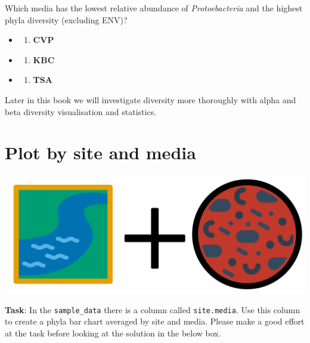 \documentclass[
]{book}
\providecommand{\tightlist}{%
  \setlength{\itemsep}{0pt}\setlength{\parskip}{0pt}}
\begin{document}
Which media has the lowest relative abundance of \emph{Protoebacteria} and the highest phyla diversity (excluding ENV)?

\begin{itemize}
\item
  \begin{enumerate}
  \def\labelenumi{(\Alph{enumi})}
  \tightlist
  \item
    \textbf{CVP}\\
  \end{enumerate}
\item
  \begin{enumerate}
  \def\labelenumi{(\Alph{enumi})}
  \setcounter{enumi}{1}
  \tightlist
  \item
    \textbf{KBC}\\
  \end{enumerate}
\item
  \begin{enumerate}
  \def\labelenumi{(\Alph{enumi})}
  \setcounter{enumi}{2}
  \tightlist
  \item
    \textbf{TSA}
  \end{enumerate}
\end{itemize}

Later in this book we will investigate diversity more thoroughly with alpha and beta diversity visualisation and statistics.

\hypertarget{plot-by-site-and-media}{%
\section{Plot by site and media}\label{plot-by-site-and-media}}

\includegraphics{figures/site_and_media.png}

\textbf{Task}: In the \texttt{sample\_data} there is a column called \texttt{site.media}.
Use this column to create a phyla bar chart averaged by site and media.
Please make a good effort at the task before looking at the solution in the below box.
\end{document}
